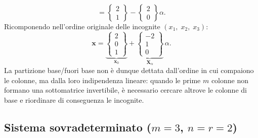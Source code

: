 \begin{esempio}
\begin{equation}
		= \begin{Bmatrix} 2 \\ 1 \end{Bmatrix}
		- \begin{Bmatrix} 2 \\ 0 \end{Bmatrix}\alpha.
	\end{equation}
	Ricomponendo nell'ordine originale delle incognite
	$(x_1,\;x_2,\;x_3)$:
	\begin{equation}
		\bm{x}
		= \underbrace{\begin{Bmatrix} 2 \\ 0 \\ 1 \end{Bmatrix}}_{\bm{x}_0}
		+ \underbrace{\begin{Bmatrix} -2 \\ 1 \\ 0 \end{Bmatrix}}_{\bm{X}_\alpha}\,\alpha.
	\end{equation}
	La partizione base/fuori base non \`e dunque dettata dall'ordine in
	cui compaiono le colonne, ma dalla loro indipendenza lineare:
	quando le prime $m$ colonne non formano una sottomatrice invertibile,
	\`e necessario cercare altrove le colonne di base e riordinare di
	conseguenza le incognite.
\end{esempio}


\subsection{Sistema sovradeterminato (\texorpdfstring{$m=3$, $n=r=2$}{m=3, n=r=2})}

